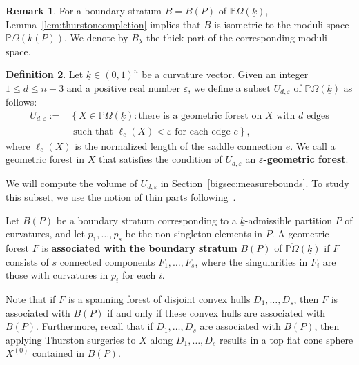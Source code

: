 \documentclass{compositio}
\numberwithin{equation}{section}
\numberwithin{figure}{section}
\theoremstyle{definition}
\newtheorem{definition}{Definition}[section]
\newtheorem{remark}[definition]{Remark}
\theoremstyle{plain}
\begin{document}
{\begin{remark}
    For a boundary stratum $B=B(P)$ of $\overline{\mathbb{P}\Omega}(\underline{k})$, Lemma~\ref{lem:thurstoncompletion} implies that $B$ is isometric to the moduli space $\mathbb{P}\Omega(\underline{k}(P))$. We denote by $B_{\lambda}$ the thick part of the corresponding moduli space.
\end{remark}

\begin{definition}
    Let $\underline{k}\in(0,1)^n$ be a curvature vector. Given an integer $1 \leq d \leq n-3$ and a positive real number $\varepsilon$, we define a subset $U_{d,\varepsilon}$ of $\mathbb{P}\Omega(\underline{k})$ as follows:
\begin{equation}\label{equ:ngbh}
    \begin{aligned}
    U_{d,\varepsilon} := &\left\{X \in \mathbb{P}\Omega(\underline{k}) :
    \mbox{there is a geometric forest on } X \mbox{ with } d \mbox{ edges} \right.\\
        &\left. \mbox{ such that } \ell_{e}(X) < \varepsilon \mbox{ for each edge } e \right\},
    \end{aligned}
\end{equation}
where $\ell_{e}(X)$ is the normalized length of the saddle connection $e$. We call a geometric forest in $X$ that satisfies the condition of $U_{d,\varepsilon}$ an \textbf{$\varepsilon$-geometric forest}.
\end{definition}

We will compute the volume of $U_{d,\varepsilon}$ in Section~\ref{bigsec:measurebounds}. To study this subset, we use the notion of thin parts following~\cite{fu2024uniformlengthestimatestrajectories}.

Let $B(P)$ be a boundary stratum corresponding to a $\underline{k}$-admissible partition $P$ of curvatures, and let $p_1, \ldots, p_s$ be the non-singleton elements in $P$. A geometric forest $F$ is \textbf{associated with the boundary stratum} $B(P)$ of $\overline{\mathbb{P}\Omega}(\underline{k})$ if $F$ consists of $s$ connected components $F_1, \ldots, F_s$, where the singularities in $F_i$ are those with curvatures in $p_i$ for each $i$. 

Note that if $F$ is a spanning forest of disjoint convex hulls $D_1, \ldots, D_s$, then $F$ is associated with $B(P)$ if and only if these convex hulls are associated with $B(P)$. Furthermore, recall that if $D_1,\ldots, D_s$ are associated with $B(P)$, then applying Thurston surgeries to $X$ along $D_1, \ldots, D_s$ results in a top flat cone sphere $X^{(0)}$ contained in $B(P)$.

}
\end{document}

